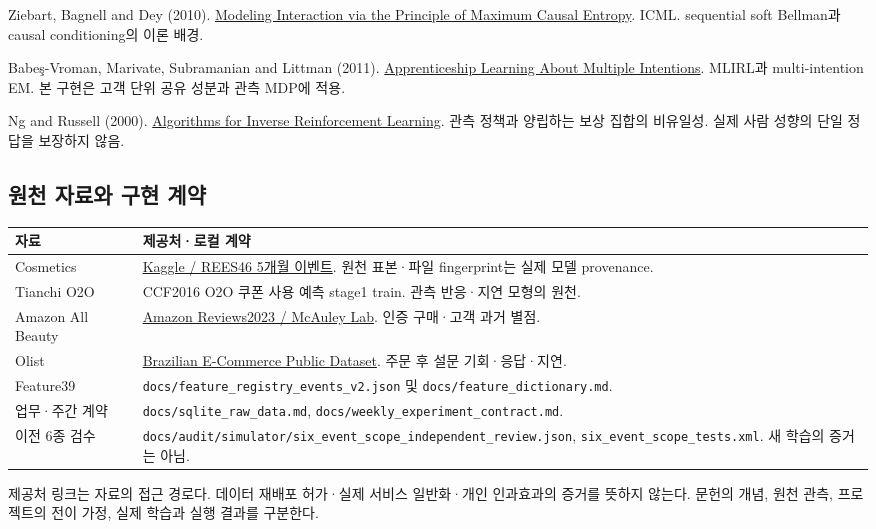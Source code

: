 \documentclass[11pt,a4paper]{article}
\newcommand{\code}[1]{{\ttfamily\footnotesize\nolinkurl{#1}}}
\newcommand{\note}[1]{\par\noindent\colorbox{pale}{\parbox{\dimexpr\linewidth-2\fboxsep}{\small #1}}\par}
\newcommand{\page}{\clearpage}
\newcommand{\thead}{\rowcolor{pale}}
\begin{document}
\page
{\small\begin{description}[leftmargin=10mm,labelwidth=9mm,itemsep=6pt,font=\bfseries]
\item[R20] Ziebart, Bagnell and Dey (2010). \href{https://icml.cc/Conferences/2010/papers/28.pdf}{Modeling Interaction via the Principle of Maximum Causal Entropy}. ICML. sequential soft Bellman과 causal conditioning의 이론 배경.
\item[R22] Babeş-Vroman, Marivate, Subramanian and Littman (2011). \href{https://icml.cc/Conferences/2011/papers/478_icmlpaper.pdf}{Apprenticeship Learning About Multiple Intentions}. MLIRL과 multi-intention EM. 본 구현은 고객 단위 공유 성분과 관측 MDP에 적용.
\item[R23] Ng and Russell (2000). \href{https://ai.stanford.edu/~ang/papers/icml00-irl.pdf}{Algorithms for Inverse Reinforcement Learning}. 관측 정책과 양립하는 보상 집합의 비유일성. 실제 사람 성향의 단일 정답을 보장하지 않음.
\end{description}}

\subsection*{원천 자료와 구현 계약}
{\small\begin{tabularx}{\linewidth}{@{}P{.25\linewidth}Y@{}}\thead 자료 & 제공처·로컬 계약\\\midrule
Cosmetics & \href{https://www.kaggle.com/datasets/mkechinov/ecommerce-events-history-in-cosmetics-shop}{Kaggle / REES46 5개월 이벤트}. 원천 표본·파일 fingerprint는 실제 모델 provenance.\\
Tianchi O2O & CCF2016 O2O 쿠폰 사용 예측 stage1 train. 관측 반응·지연 모형의 원천.\\
Amazon All Beauty & \href{https://amazon-reviews-2023.github.io/}{Amazon Reviews2023 / McAuley Lab}. 인증 구매·고객 과거 별점.\\
Olist & \href{https://www.kaggle.com/datasets/olistbr/brazilian-ecommerce}{Brazilian E-Commerce Public Dataset}. 주문 후 설문 기회·응답·지연.\\
Feature39 & \code{docs/feature_registry_events_v2.json} 및 \code{docs/feature_dictionary.md}.\\
업무·주간 계약 & \code{docs/sqlite_raw_data.md}, \code{docs/weekly_experiment_contract.md}.\\
이전 6종 검수 & \code{docs/audit/simulator/six_event_scope_independent_review.json}, \code{six_event_scope_tests.xml}. 새 학습의 증거는 아님.\\\bottomrule\end{tabularx}}

\vspace{8pt}
\note{제공처 링크는 자료의 접근 경로다. 데이터 재배포 허가·실제 서비스 일반화·개인 인과효과의 증거를 뜻하지 않는다. 문헌의 개념, 원천 관측, 프로젝트의 전이 가정, 실제 학습과 실행 결과를 구분한다.}
\end{document}
